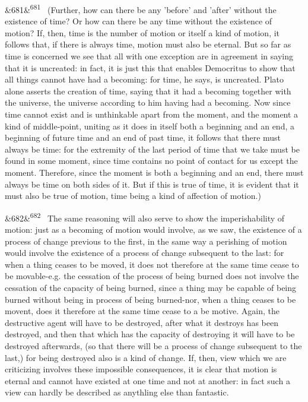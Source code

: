 \documentclass[12pt]{article}
\newcommand{\para}[1][]{\par\noindent\ifx&#1&\else\textsuperscript{\footnotesize #1}~\fi}
\begin{document}
\para[681] (Further, how can there be any 'before' and 'after' without the existence of time? Or how can there be any time without the existence of motion? If, then, time is the number of motion or itself a kind of motion, it follows that, if there is always time, motion must also be eternal. But so far as time is concerned we see that all with one exception are in agreement in saying that it is uncreated: in fact, it is just this that enables Democritus to show that all things cannot have had a becoming: for time, he says, is uncreated. Plato alone asserts the creation of time, saying that it had a becoming together with the universe, the universe according to him having had a becoming. Now since time cannot exist and is unthinkable apart from the moment, and the moment a kind of middle-point, uniting as it does in itself both a beginning and an end, a beginning of future time and an end of past time, it follows that there must always be time: for the extremity of the last period of time that we take must be found in some moment, since time contains no point of contact for us except the moment. Therefore, since the moment is both a beginning and an end, there must always be time on both sides of it. But if this is true of time, it is evident that it must also be true of motion, time being a kind of affection of motion.)

\para[682] The same reasoning will also serve to show the imperishability of motion: just as a becoming of motion would involve, as we saw, the existence of a process of change previous to the first, in the same way a perishing of motion would involve the existence of a process of change subsequent to the last: for when a thing ceases to be moved, it does not therefore at the same time cease to be movable-e.g. the cessation of the process of being burned does not involve the cessation of the capacity of being burned, since a thing may be capable of being burned without being in process of being burned-nor, when a thing ceases to be movent, does it therefore at the same time cease to a be motive. Again, the destructive agent will have to be destroyed, after what it destroys has been destroyed, and then that which has the capacity of destroying it will have to be destroyed afterwards, (so that there will be a process of change subsequent to the last,) for being destroyed also is a kind of change. If, then, view which we are criticizing involves these impossible consequences, it is clear that motion is eternal and cannot have existed at one time and not at another: in fact such a view can hardly be described as anythling else than fantastic.
\end{document}
